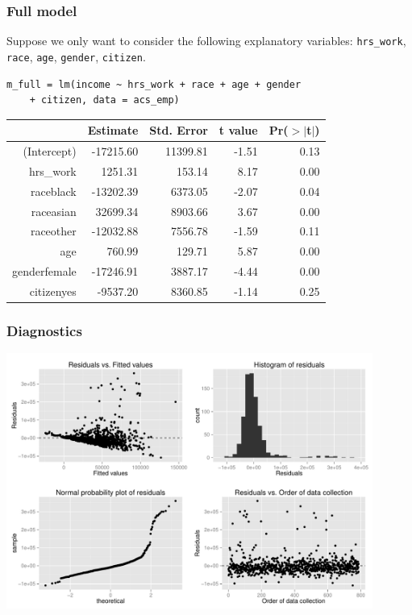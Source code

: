 \documentclass[11pt,containsverbatim,handout,xcolor=xelatex,dvipsnames,table]{beamer}
\begin{document}
\begin{frame}[fragile]
\frametitle{Full model}

Suppose we only want to consider the following explanatory variables: \texttt{hrs\_work}, \texttt{race}, \texttt{age}, \texttt{gender}, \texttt{citizen}.

{\footnotesize
\begin{Verbatim}[frame=single, formatcom=\color{blue}]
m_full = lm(income ~ hrs_work + race + age + gender 
    + citizen, data = acs_emp)
\end{Verbatim}
}

\pause

\begin{center}
{\small
\begin{tabular}{rrrrr}
  \hline
 & Estimate & Std. Error & t value & Pr($>$$|$t$|$) \\ 
  \hline
(Intercept) & -17215.60 & 11399.81 & -1.51 & 0.13 \\ 
  hrs\_work & 1251.31 & 153.14 & 8.17 & 0.00 \\ 
  raceblack & -13202.39 & 6373.05 & -2.07 & 0.04 \\ 
  raceasian & 32699.34 & 8903.66 & 3.67 & 0.00 \\ 
  raceother & -12032.88 & 7556.78 & -1.59 & 0.11 \\ 
  age & 760.99 & 129.71 & 5.87 & 0.00 \\ 
  genderfemale & -17246.91 & 3887.17 & -4.44 & 0.00 \\ 
  citizenyes & -9537.20 & 8360.85 & -1.14 & 0.25 \\ 
   \hline
\end{tabular}
}
\end{center}

\end{frame}


\begin{frame}[fragile]
\frametitle{Diagnostics}


\begin{center}
\includegraphics[width=0.9\textwidth]{figures/acs/diag}
\end{center}


\end{frame}
\end{document}
